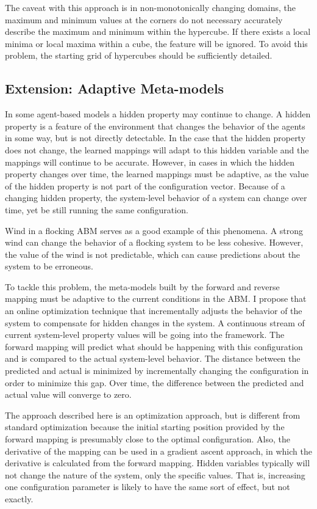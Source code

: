 The caveat with this approach is in non-monotonically changing domains, the maximum and minimum values at the corners do not necessary accurately describe the maximum and minimum within the hypercube.
If there exists a local minima or local maxima within a cube, the feature will be ignored.
To avoid this problem, the starting grid of hypercubes should be sufficiently detailed.



\subsection{Extension: Adaptive Meta-models}

In some agent-based models a hidden property may continue to change.
A hidden property is a feature of the environment that changes the behavior of the agents in some way, but is not directly detectable.
In the case that the hidden property does not change, the learned mappings will adapt to this hidden variable and the mappings will continue to be accurate.
However, in cases in which the hidden property changes over time, the learned mappings must be adaptive, as the value of the hidden property is not part of the configuration vector.
Because of a changing hidden property, the system-level behavior of a system can change over time, yet be still running the same configuration.

Wind in a flocking ABM serves as a good example of this phenomena.
A strong wind can change the behavior of a flocking system to be less cohesive.
However, the value of the wind is not predictable, which can cause predictions about the system to be erroneous.

To tackle this problem, the meta-models built by the forward and reverse mapping must be adaptive to the current conditions in the ABM.
I propose that an online optimization technique that incrementally adjusts the behavior of the system to compensate for hidden changes in the system.
A continuous stream of current system-level property values will be going into the framework.
The forward mapping will predict what should be happening with this configuration and is compared to the actual system-level behavior.
The distance between the predicted and actual is minimized by incrementally changing the configuration in order to minimize this gap.
Over time, the difference between the predicted and actual value will converge to zero.

The approach described here is an optimization approach, but is different from standard optimization because the initial starting position provided by the forward mapping is presumably close to the optimal configuration.
Also, the derivative of the mapping can be used in a gradient ascent approach, in which the derivative is calculated from the forward mapping.
Hidden variables typically will not change the nature of the system, only the specific values.
That is, increasing one configuration parameter is likely to have the same sort of effect, but not exactly.


